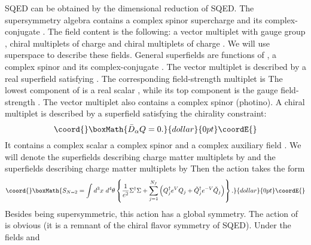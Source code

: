 \documentclass[a4paper,12pt, amsfonts, amssymb]{article}
\providecommand{\RR}{{\mathbb R}}
\providecommand{\eps}{\epsilon}
\providecommand{\tQ}{{\tilde Q}}
\providecommand{\bD}{{\bar D}}
\providecommand{\btheta}{{\bar \theta}}
\providecommand{\Q}{{\mathsf Q}}
\begin{document}
\coordHE{}  \coordHE{} SQED can be obtained by the dimensional reduction of \coordHE{}  \coordHE{}
SQED. The supersymmetry algebra contains a complex spinor supercharge \myHighlight{$\Q_\alpha$}\coordHE{} and its complex-conjugate \myHighlight{$\bar{\Q}_\alpha$}\coordHE{}.
The field content is the following: a vector multiplet with gauge
group \coordHE{}, \coordHE{} chiral multiplets of charge \coordHE{} and \coordHE{} chiral multiplets
of charge \coordHE{}. We will use \coordHE{} superspace to describe these fields.
General superfields are functions of \myHighlight{$x\in\RR^{2,1}$}\coordHE{}, a complex spinor 
\myHighlight{$\theta_\alpha,$}\coordHE{} and its complex-conjugate \myHighlight{$\btheta_\alpha$}\coordHE{}. 
The vector multiplet is described
by a real superfield \myHighlight{$V(x,\theta,\btheta)$}\coordHE{} satisfying \coordHE{}. 
The corresponding field-strength multiplet is 
\myHighlight{$\Sigma=\eps^{\alpha\beta}D_\alpha \bD_\beta V.$}\coordHE{} The lowest component of
\myHighlight{$\Sigma$}\coordHE{} is a real scalar \myHighlight{$\chi$}\coordHE{}, while its top component is the gauge 
field-strength \coordHE{}.
The vector multiplet also contains a complex spinor \myHighlight{$\lambda_\alpha$}\coordHE{} (photino).
A chiral multiplet is described by a superfield \myHighlight{$Q(x,\theta,\btheta)$}\coordHE{} 
satisfying the chirality constraint:
$$\coord{}\boxMath{
\bD_\alpha Q=0.
}{dollar}{0pt}\coordE{}$$
It contains a complex scalar \coordHE{} a complex spinor \myHighlight{$\psi_\alpha,$}\coordHE{} and a
complex auxiliary field \coordHE{}.
We will denote the superfields describing charge \coordHE{} matter multiplets 
by \coordHE{}  \coordHE{} and the superfields describing charge \coordHE{} matter multiplets by \myHighlight{$\tQ_j,$}\coordHE{}  \coordHE{} Then the action takes the
form
$$\coord{}\boxMath{
S_{N=2}=\int d^3 x\ d^4\theta\left\{\frac{1}{e^2}\Sigma^\dag\Sigma+
\sum_{j=1}^{N_f}\left(Q_j^\dag e^V Q_j+\tQ_j^\dag e^{-V} \tQ_j \right)\right\}.
}{dollar}{0pt}\coordE{}$$
Besides being supersymmetric, this action has a global \coordHE{} symmetry. 
The action of \coordHE{} is obvious (it is a remnant of the chiral flavor symmetry of \coordHE{}  \coordHE{} SQED). Under \coordHE{} the fields \coordHE{} and
\end{document}
